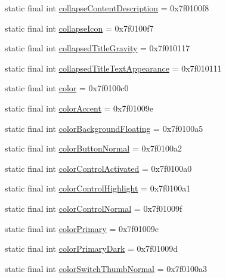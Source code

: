 \begin{CompactItemize}
\item 
static final int \hyperlink{classandroid_1_1support_1_1coreutils_1_1_r_1_1attr_ee7d0b450b157efddb4627551f53c9ad}{collapseContentDescription} = 0x7f0100f8
\item 
static final int \hyperlink{classandroid_1_1support_1_1coreutils_1_1_r_1_1attr_bc11a54c31fe152c46baa5973dec82e8}{collapseIcon} = 0x7f0100f7
\item 
static final int \hyperlink{classandroid_1_1support_1_1coreutils_1_1_r_1_1attr_cbf53796bde3e8e790deea8d556b8200}{collapsedTitleGravity} = 0x7f010117
\item 
static final int \hyperlink{classandroid_1_1support_1_1coreutils_1_1_r_1_1attr_ba474768d9b4143779115eefd8dd21f3}{collapsedTitleTextAppearance} = 0x7f010111
\item 
static final int \hyperlink{classandroid_1_1support_1_1coreutils_1_1_r_1_1attr_8e83f6ebc369592781313701375343a4}{color} = 0x7f0100c0
\item 
static final int \hyperlink{classandroid_1_1support_1_1coreutils_1_1_r_1_1attr_339aa6a0c2a142d37f49a753bb145362}{colorAccent} = 0x7f01009e
\item 
static final int \hyperlink{classandroid_1_1support_1_1coreutils_1_1_r_1_1attr_bfc3fecc62018513d2f91ef116d103c5}{colorBackgroundFloating} = 0x7f0100a5
\item 
static final int \hyperlink{classandroid_1_1support_1_1coreutils_1_1_r_1_1attr_5e6e8befd4af72608d41645944cffa0a}{colorButtonNormal} = 0x7f0100a2
\item 
static final int \hyperlink{classandroid_1_1support_1_1coreutils_1_1_r_1_1attr_bcbbcbd36b5f47a753a37968aec363d6}{colorControlActivated} = 0x7f0100a0
\item 
static final int \hyperlink{classandroid_1_1support_1_1coreutils_1_1_r_1_1attr_19ef81e42503602cb71899b90a1022a1}{colorControlHighlight} = 0x7f0100a1
\item 
static final int \hyperlink{classandroid_1_1support_1_1coreutils_1_1_r_1_1attr_724ca33cd87491f83ff66d2c18cbf73d}{colorControlNormal} = 0x7f01009f
\item 
static final int \hyperlink{classandroid_1_1support_1_1coreutils_1_1_r_1_1attr_dccfafcc3fe254276331d3e339d33cb1}{colorPrimary} = 0x7f01009c
\item 
static final int \hyperlink{classandroid_1_1support_1_1coreutils_1_1_r_1_1attr_1f23e92eb340ea537711e2c2c20de08e}{colorPrimaryDark} = 0x7f01009d
\item 
static final int \hyperlink{classandroid_1_1support_1_1coreutils_1_1_r_1_1attr_5bd634a4785e4869aa2e850c18b6947e}{colorSwitchThumbNormal} = 0x7f0100a3

\end{CompactItemize}
